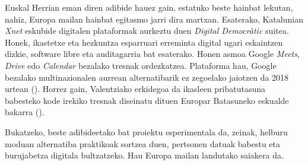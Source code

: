 Euskal Herrian eman diren adibide hauez gain, estatuko beste hainbat lekutan, nahiz, Europa mailan hainbat egitasmo jarri dira martxan. Esaterako, Katalunian \textit{Xnet} eskubide digitalen plataformak aurkeztu duen \textit{Digital Democràtic} suitea. Honek, ikastetxe eta hezkuntza esparruari erreminta digital ugari eskaintzen dizkie, software libre eta auditagarria bat esaterako. Honen asmoa Google \textit{Meets}, \textit{Drive} edo \textit{Calendar} bezalako tresnak ordezkatzea. Plataforma hau, Google bezalako multinazionalen aurrean alternatibarik ez zegoelako jaiotzen da 2018 urtean (\cite{vicente2022}). Horrez gain, Valentziako erkidegoa da ikasleen pribatutasuna babesteko kode irekiko tresnak diseinatu dituen Europar Batasuneko eskualde bakarra (\cite{barcenilla2021gv}).

Bukatzeko, beste adibideetako bat \citeauthor{decode2017what} \citeyear{decode2017what} proiektu esperimentala da, zeinak, helburu moduan alternatiba praktikoak sortzea duen, pertsonen datuak babestu eta burujabetza digitala bultzatzeko. Hau Europa mailan landutako saiakera da. 